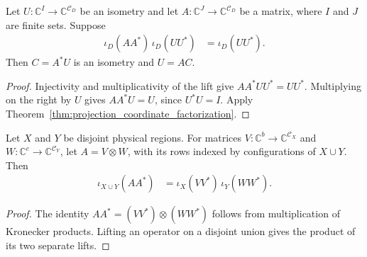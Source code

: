 \begin{theorem}
    \label{thm:local_projection_range_coordinates}
    \leanok
    Let $U:\mathbb C^I\to\mathbb C^{\mathcal C_D}$ be an isometry and
    let $A:\mathbb C^J\to\mathbb C^{\mathcal C_D}$ be a matrix, where
    $I$ and $J$ are finite sets. Suppose
    \begin{align}
        \iota_D(AA^*)\,\iota_D(UU^*)&=\iota_D(UU^*).
        \label{eq:local_projection_range_containment}
    \end{align}
    Then $C=A^*U$ is an isometry and $U=AC$.
\end{theorem}
\begin{proof}\leanok
    Injectivity and multiplicativity of the lift give
    $AA^*UU^*=UU^*$. Multiplying on the right by $U$ gives
    $AA^*U=U$, since $U^*U=I$.
    Apply Theorem~\ref{thm:projection_coordinate_factorization}.
\end{proof}

\begin{lemma}
    \label{lem:local_tensor_column_ranges}
    \leanok
    Let $X$ and $Y$ be disjoint physical regions. For matrices
    $V:\mathbb C^b\to\mathbb C^{\mathcal C_X}$ and
    $W:\mathbb C^c\to\mathbb C^{\mathcal C_Y}$, let
    $A=V\otimes W$, with its rows indexed by configurations of $X\cup Y$.
    Then
    \begin{align}
        \iota_{X\cup Y}(AA^*)&=\iota_X(VV^*)\,\iota_Y(WW^*).
        \label{eq:local_tensor_column_ranges}
    \end{align}
\end{lemma}
\begin{proof}\leanok
    The identity $AA^*=(VV^*)\otimes(WW^*)$ follows from multiplication
    of Kronecker products. Lifting an operator on a disjoint union
    gives the product of its two separate lifts.
\end{proof}

